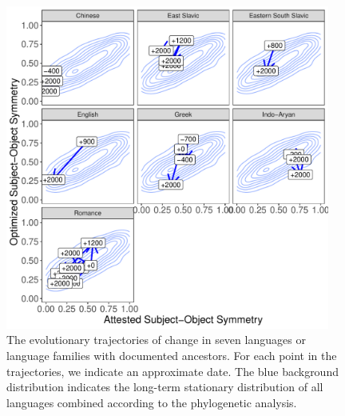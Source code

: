 \documentclass[11pt,a4paper]{article}
\begin{document}

\begin{figure}
    \centering
    \includegraphics[width=0.95\textwidth]{../analysis/figures/historical_2.6_times_stationary.pdf}
    \caption{The evolutionary trajectories of change in seven languages or language families with documented ancestors. For each point in the trajectories, we indicate an approximate date. The blue background distribution indicates the long-term stationary distribution of all languages combined according to the phylogenetic analysis. }
    \label{fig:historical}
\end{figure}




\end{document}
